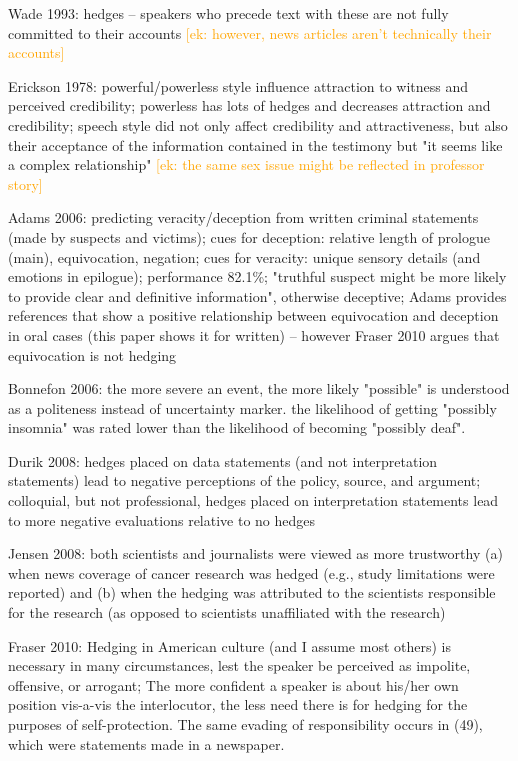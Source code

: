 \documentclass[11pt,a4paper]{article}
\newcommand{\ek}[1]{\textcolor{Orange}{[ek: #1]}}
\begin{document}
Wade 1993: hedges -- speakers who precede text with these are not fully committed to their accounts \ek{however, news articles aren't technically their accounts}

Erickson 1978: powerful/powerless style influence attraction to witness and perceived credibility; powerless has lots of hedges and decreases attraction and credibility; speech style did not only affect credibility and attractiveness, but also their acceptance of the information contained in the testimony but "it seems like a complex relationship" \ek{the same sex issue might be reflected in professor story}

Adams 2006: predicting veracity/deception from written criminal statements (made by suspects and victims); cues for deception: relative length of prologue (main), equivocation, negation; cues for veracity: unique sensory details (and emotions in epilogue); performance 82.1\%; "truthful suspect might be more likely to provide clear and definitive information", otherwise deceptive; Adams provides references that show a positive relationship between equivocation and deception in oral cases (this paper shows it for written) -- however Fraser 2010 argues that equivocation is not hedging

Bonnefon 2006: the more severe an event, the more likely "possible" is understood as a politeness instead of uncertainty marker. the likelihood of getting "possibly insomnia" was rated lower than the likelihood of becoming "possibly deaf".

Durik 2008:  hedges placed on data statements (and not interpretation statements) lead to negative perceptions of the policy, source, and argument;  colloquial, but not professional, hedges placed on interpretation statements lead to more negative evaluations relative to no hedges

Jensen 2008:  both scientists and journalists were viewed as more trustworthy
(a) when news coverage of cancer research was hedged (e.g., study limitations were reported) and (b) when the hedging was attributed to the scientists responsible for the research (as opposed to scientists unaffiliated with the research)

Fraser 2010:  Hedging in American culture (and I assume most others) is necessary in many circumstances, lest the speaker be perceived as impolite, offensive, or arrogant; The more confident a speaker is about his/her own position vis-a-vis the interlocutor, the less need there is for hedging for the purposes of self-protection. The same evading of responsibility occurs in (49), which were statements made in a newspaper.
\end{document}
